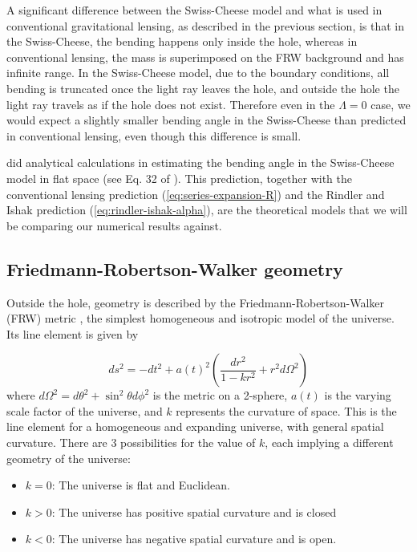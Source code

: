 A significant difference between the Swiss-Cheese model and what is used in conventional gravitational lensing, as described in the previous section, is that in the Swiss-Cheese, the bending happens only inside the hole, whereas in conventional lensing, the mass is superimposed on the FRW background and has infinite range. In the Swiss-Cheese model, due to the boundary conditions, all bending is truncated once the light ray leaves the hole, and outside the hole the light ray travels as if the hole does not exist. Therefore even in the $\Lambda = 0$ case, we would expect a slightly smaller bending angle in the Swiss-Cheese than predicted in conventional lensing, even though this difference is small. 

\citet{kantowski2010gravitational} did analytical calculations in estimating the bending angle in the Swiss-Cheese model in flat space (see Eq. 32 of \citet{kantowski2010gravitational}). This prediction, together with the conventional lensing prediction (\autoref{eq:series-expansion-R}) and the Rindler and Ishak prediction (\autoref{eq:rindler-ishak-alpha}), are the theoretical models that we will be comparing our numerical results against. 


\subsection{Friedmann-Robertson-Walker geometry}

Outside the hole, geometry is described by the Friedmann-Robertson-Walker (FRW) metric \cite{wald2010general}, the simplest homogeneous and isotropic model of the universe. Its line element is given by

\begin{equation}
  ds^2 = -dt^2 + a(t)^2 \left ( \frac{dr^2}{1-kr^2} + r^2 d \Omega^2 \right )
  \label{eq:frw-metric}
\end{equation}
where $d \Omega^2 = d\theta^2 + \sin^2\theta d\phi^2$ is the metric on a 2-sphere, $a(t)$ is the varying scale factor of the universe, and $k$ represents the curvature of space. This is the line element for a homogeneous and expanding universe, with general spatial curvature. There are 3 possibilities for the value of $k$, each implying a different geometry of the universe:

\begin{itemize}
  \item $k = 0$: The universe is flat and Euclidean.
  \item $k > 0$: The universe has positive spatial curvature and is closed
  \item $k < 0$: The universe has negative spatial curvature and is open. 
\end{itemize}

